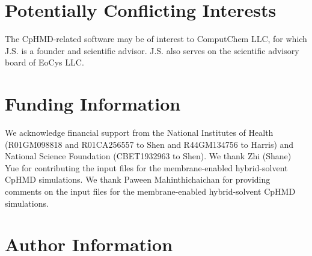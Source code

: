 \documentclass[9pt,tutorial]{livecoms}
\begin{document}
\section{Potentially Conflicting Interests}
The CpHMD-related software may be of interest to ComputChem LLC, for which
J.S. is a founder and scientific advisor. 
J.S. also serves on the scientific advisory board of EoCys LLC.

\section{Funding Information}
We acknowledge financial support from the National Institutes of Health (R01GM098818 and R01CA256557 to Shen and R44GM134756 to Harris) and National Science Foundation (CBET1932963 to Shen). 
We thank Zhi (Shane) Yue for contributing the input files for the membrane-enabled hybrid-solvent CpHMD simulations.
We thank Paween Mahinthichaichan for providing comments on the input files for the membrane-enabled hybrid-solvent CpHMD simulations.


\section*{Author Information}
\makeorcid




\end{document}
